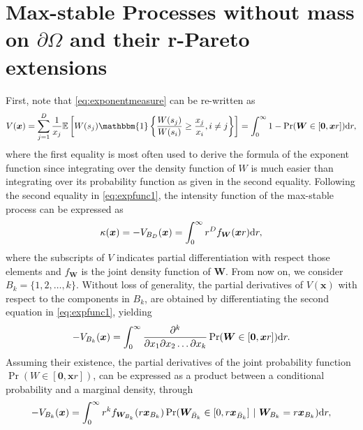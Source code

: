 \documentclass[12pt]{article}
\begin{document}
\section{Max-stable Processes without mass on $\partial\Omega$ and their r-Pareto extensions} 
\label{sec:theory}
First, note that \eqref{eq:exponentmeasure} can be re-written as
\begin{equation}\label{eq:expfunc1}
V(\bm x) = \sum_{j=1}^D \frac{1}{x_j} \mathbb E\left[W(s_j)\mathbbm{1}\left\{ \frac{W(s_j)}{W(s_i)} \geq \frac{x_j}{x_i},i\neq j \right\} \right] = \int_0^\infty 1 - \Pr(\bm W \in [\bm 0,\bm xr ])\text dr,
\end{equation}
where the first equality is most often used to derive the formula of the exponent function \citep{Wadsworth.Tawn:2014, Huser.Davison:2013a} since integrating over the density function of $W$ is much easier than integrating over its probability function as given in the second equality.
Following the second equality in \eqref{eq:expfunc1}, the intensity function of the max-stable process can be expressed as 
\begin{equation}\label{eq:intensity}
	\kappa(\bm x) = -V_{B_D}(\bm x) = \int_0^\infty r^D f_{\bm W}(\bm xr)\text dr,
\end{equation} 
where the subscripts of $V$ indicates partial differentiation with respect those elements and $f_{\bm W}$ is the joint density function of $\bm W$. From now on, we consider $B_k = \{1,2,\dots,k\}$. Without loss of generality, the partial derivatives of $V(\bm x)$ with respect to the components in $B_k$, are obtained by differentiating the second equation in \eqref{eq:expfunc1}, yielding
\begin{equation}\label{eq:partialV_1}
 -V_{B_k}(\bm x) = \int_0^\infty \frac{\partial^k}{\partial x_1\partial x_2\dots \partial x_k}\Pr(\bm W \in [\bm 0,\bm xr ])\text dr. 
\end{equation}
Assuming their existence, the partial derivatives of the joint probability function $\Pr(W\in [\bm 0,\bm xr])$, can be expressed as a product between a conditional probability and a marginal density, through
\begin{equation}\label{eq:partialV_2}
 -V_{B_k}(\bm x) = \int_0^\infty r^k f_{\bm W_{B_k}}(r \bm x_{B_k})  \Pr(\bm W_{\bar{B}_k} \in [0,r \bm x_{\bar{B}_k} ]\ |\ \bm W_{B_k} = r \bm x_{B_k} )\text dr,
\end{equation}
\end{document}
